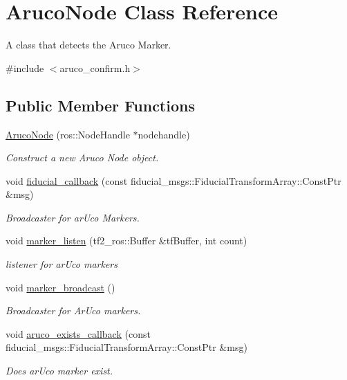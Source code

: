 \hypertarget{class_aruco_node}{}\section{Aruco\+Node Class Reference}
\label{class_aruco_node}


A class that detects the Aruco Marker.  




{\ttfamily \#include $<$aruco\+\_\+confirm.\+h$>$}

\subsection*{Public Member Functions}
\begin{DoxyCompactItemize}
\item 
\hyperlink{class_aruco_node_ad539e5027a1d41e9e62f354db9ec40aa}{Aruco\+Node} (ros\+::\+Node\+Handle $\ast$nodehandle)
\begin{DoxyCompactList}\small\item\em Construct a new Aruco Node object. \end{DoxyCompactList}\item 
void \hyperlink{class_aruco_node_af68c583d73a36c483d28b96a6fd22713}{fiducial\+\_\+callback} (const fiducial\+\_\+msgs\+::\+Fiducial\+Transform\+Array\+::\+Const\+Ptr \&msg)
\begin{DoxyCompactList}\small\item\em Broadcaster for ar\+Uco Markers. \end{DoxyCompactList}\item 
void \hyperlink{class_aruco_node_ad79fd951057c9a40f34fc159363fbd94}{marker\+\_\+listen} (tf2\+\_\+ros\+::\+Buffer \&tf\+Buffer, int count)
\begin{DoxyCompactList}\small\item\em listener for ar\+Uco markers \end{DoxyCompactList}\item 
void \hyperlink{class_aruco_node_adb4d7fb3af40cb83ae69be077c589558}{marker\+\_\+broadcast} ()
\begin{DoxyCompactList}\small\item\em Broadcaster for Ar\+Uco markers. \end{DoxyCompactList}\item 
void \hyperlink{class_aruco_node_a38f5977cae0f0cc0d30449db22b2e9d6}{aruco\+\_\+exists\+\_\+callback} (const fiducial\+\_\+msgs\+::\+Fiducial\+Transform\+Array\+::\+Const\+Ptr \&msg)
\begin{DoxyCompactList}\small\item\em Does ar\+Uco marker exist. \end{DoxyCompactList}\item 

\end{DoxyCompactItemize}
